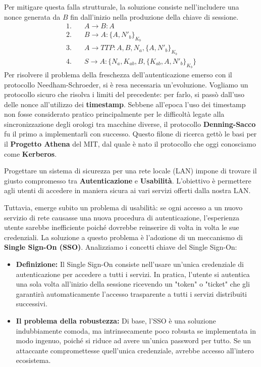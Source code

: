 Per mitigare questa falla strutturale, la soluzione consiste nell'includere una nonce generata da $B$ fin dall'inizio nella produzione della chiave di sessione.
\begin{align*}
    1.\quad & A \rightarrow B : A \\
    2.\quad & B \rightarrow A : \{A, N'_b\}_{K_{b}} \\
    3.\quad & A \rightarrow TTP : A, B, N_a, \{A, N'_b\}_{K_b} \\
    4.\quad & S \rightarrow A: \{N_a,K_{ab}, B,\{K_{ab}, A, N'_b\}_{K_b} \}
\end{align*}
Per risolvere il problema della freschezza dell'autenticazione emerso con il protocollo Needham-Schroeder, si è resa necessaria un'evoluzione. Vogliamo un protocollo sicuro che risolva i limiti del precedente: per farlo, si passò dall'uso delle nonce all'utilizzo dei \textbf{timestamp}. Sebbene all'epoca l'uso dei timestamp non fosse considerato pratico principalmente per le difficoltà legate alla sincronizzazione degli orologi tra macchine diverse, il protocollo \textbf{Denning-Sacco} fu il primo a implementarli con successo. Questo filone di ricerca gettò le basi per il \textbf{Progetto Athena} del MIT, dal quale è nato il protocollo che oggi conosciamo come \textbf{Kerberos}.


Progettare un sistema di sicurezza per una rete locale (LAN) impone di trovare il giusto compromesso tra \textbf{Autenticazione} e \textbf{Usabilità}. L'obiettivo è permettere agli utenti di accedere in maniera sicura ai vari servizi offerti dalla nostra LAN. 

Tuttavia, emerge subito un problema di usabilità: se ogni accesso a un nuovo servizio di rete causasse una nuova procedura di autenticazione, l'esperienza utente sarebbe inefficiente poiché dovrebbe reinserire di volta in volta le sue credenziali. La soluzione a questo problema è l'adozione di un meccanismo di \textbf{Single Sign-On (SSO)}.
Analizziamo i concetti chiave del Single Sign-On:
\begin{itemize}
    \item \textbf{Definizione:} Il Single Sign-On consiste nell'usare un'unica credenziale di autenticazione per accedere a tutti i servizi. In pratica, l'utente si autentica una sola volta all'inizio della sessione ricevendo un "token" o "ticket" che gli garantirà automaticamente l'accesso trasparente a tutti i servizi distribuiti successivi.
    \item \textbf{Il problema della robustezza:} Di base, l'SSO è una soluzione indubbiamente comoda, ma intrinsecamente poco robusta se implementata in modo ingenuo, poiché si riduce ad avere un'unica password per tutto. Se un attaccante compromettesse quell'unica credenziale, avrebbe accesso all'intero ecosistema.
\end{itemize}

